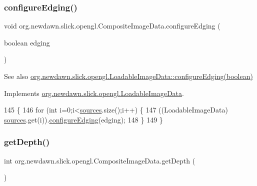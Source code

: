 \subsubsection{\texorpdfstring{configure\+Edging()}{configureEdging()}}
{\footnotesize\ttfamily void org.\+newdawn.\+slick.\+opengl.\+Composite\+Image\+Data.\+configure\+Edging (\begin{DoxyParamCaption}\item[{boolean}]{edging }\end{DoxyParamCaption})\hspace{0.3cm}{\ttfamily [inline]}}

\begin{DoxySeeAlso}{See also}
\mbox{\hyperlink{interfaceorg_1_1newdawn_1_1slick_1_1opengl_1_1_loadable_image_data_a1f9fb94bae3936761535408ba7afc0df}{org.\+newdawn.\+slick.\+opengl.\+Loadable\+Image\+Data\+::configure\+Edging(boolean)}} 
\end{DoxySeeAlso}


Implements \mbox{\hyperlink{interfaceorg_1_1newdawn_1_1slick_1_1opengl_1_1_loadable_image_data_a1f9fb94bae3936761535408ba7afc0df}{org.\+newdawn.\+slick.\+opengl.\+Loadable\+Image\+Data}}.


\begin{DoxyCode}
145                                                 \{
146         \textcolor{keywordflow}{for} (\textcolor{keywordtype}{int} i=0;i<\mbox{\hyperlink{classorg_1_1newdawn_1_1slick_1_1opengl_1_1_composite_image_data_a620f0a2292b907b7a3418d95d91e422c}{sources}}.size();i++) \{
147             ((LoadableImageData) \mbox{\hyperlink{classorg_1_1newdawn_1_1slick_1_1opengl_1_1_composite_image_data_a620f0a2292b907b7a3418d95d91e422c}{sources}}.get(i)).\mbox{\hyperlink{classorg_1_1newdawn_1_1slick_1_1opengl_1_1_composite_image_data_a9f2859d594b5040ea7ab930f194412ac}{configureEdging}}(edging);
148         \}
149     \}
\end{DoxyCode}
\mbox{\label{classorg_1_1newdawn_1_1slick_1_1opengl_1_1_composite_image_data_a4f8b573391ec1fea885ef56daac0a8f4}} 
\subsubsection{\texorpdfstring{get\+Depth()}{getDepth()}}
{\footnotesize\ttfamily int org.\+newdawn.\+slick.\+opengl.\+Composite\+Image\+Data.\+get\+Depth (\begin{DoxyParamCaption}{ }\end{DoxyParamCaption})\hspace{0.3cm}{\ttfamily [inline]}}

